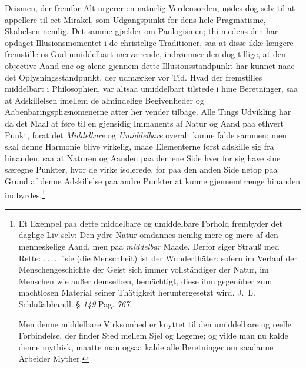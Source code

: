 \documentclass[12pt]{book}
\newcommand{\opage}[1]{\marginnote{\footnotesize\textit{[#1]}}}
\begin{document}
Deismen, der fremfor Alt urgerer en naturlig Verdensorden, nødes dog selv til at
appellere til eet Mirakel, som Udgangspunkt for dens hele Pragmatisme, Skabelsen
nemlig. Det samme gjælder om Panlogismen; thi medens den har opdaget
Illusionsmomentet i de christelige
\opage{151} \setcounter{footnote}{0}%
Traditioner, saa at disse ikke længere fremstille os Gud umiddelbart nærværende,
indrømmer den dog tillige, at den objective Aand ene og alene gjennem dette
Illusionsstandpunkt har kunnet naae det Oplysningsstandpunkt, der udmærker vor
Tid. Hvad der fremstilles middelbart i Philosophien, var altsaa umiddelbart
tilstede i hine Beretninger, saa at Adskillelsen imellem de almindelige
Begivenheder og Aabenbaringsphænomenerne atter her vender tilbage. Alle Tings
Udvikling har da det Maal at føre til en gjensidig Immanents af Natur og Aand paa
ethvert Punkt, forat det \emph{Middelbare} og \emph{Umiddelbare} overalt kunne
falde sammen; men skal denne Harmonie blive virkelig, maae Elementerne først
adskille sig fra hinanden, saa at Naturen og Aanden paa den ene Side hver for sig
have sine særegne Punkter, hvor de virke isolerede, for paa den anden Side netop
paa Grund af denne Adskillelse paa andre Punkter at kunne gjennemtrænge hinanden
indbyrdes.\footnote{Et Exempel paa dette middelbare og umiddelbare Forhold
frembyder det daglige Liv selv: Den ydre Natur omdannes nemlig mere og mere af
den menneskelige Aand, men paa \emph{middelbar} Maade. Derfor siger Strauß med
Rette: .\,.\,.\,.\ ”sie (die Menschheit) ist der Wunderthäter: sofern im Verlauf
der Menschengeschichte der Geist sich immer vollständiger der Natur, im Menschen
wie außer demselben, bemächtigt, diese ihm gegenüber zum machtlosen Material
seiner Thätigkeit heruntergesetzt wird. J.~L. Schlußabhandl. § \textit{149} Pag.
\textit{767}.

Men denne middelbare Virksomhed er knyttet til den umiddelbare og reelle
Forbindelse, der finder Sted mellem Sjel og Legeme; og vilde man nu kalde denne
mythisk, maatte man ogsaa kalde alle Beretninger om saadanne Arbeider Myther.}
\end{document}
